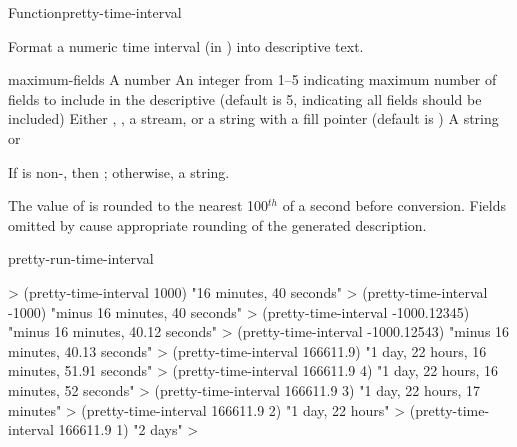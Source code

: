 \documentclass[10pt,twoside,english,pdftex]{article}
\begin{document}

\begin{functiondoc}{Function}{pretty-time-interval}{%
      
    \returns{} }
% 

\fnsyntax

\fnpurpose Format a numeric time interval (in ) into
descriptive text.

\fnpackage {}

\fnmodule {}

\fnargs
\begin{args}{maximum-fields}
\arg[seconds] A number
 An integer from 1--5 indicating maximum number of fields 
to include in the descriptive  (default is 5, indicating all 
fields should be included)
\arg[destination] Either \nil, , a stream, or a string with a fill 
pointer (default is \nil)
\arg[result] A string or \nil{}
\end{args}

\fnreturns If  is non-\nil, then \nil; otherwise, a string.

\fndescription The value of  is rounded to the nearest
100$^{th}$ of a second before conversion.  Fields omitted by
 cause appropriate rounding of the generated
description.

\begin{alsos}{pretty-run-time-interval}
\end{alsos}

\fnexamples
%
\W\supp
\begin{example}
  > (pretty-time-interval 1000)
  "16 minutes, 40 seconds"
  > (pretty-time-interval -1000)
  "minus 16 minutes, 40 seconds"
  > (pretty-time-interval -1000.12345)
  "minus 16 minutes, 40.12 seconds"
  > (pretty-time-interval -1000.12543)
  "minus 16 minutes, 40.13 seconds"\goodpagebreak
  > (pretty-time-interval 166611.9)
  "1 day, 22 hours, 16 minutes, 51.91 seconds"
  > (pretty-time-interval 166611.9 4)
  "1 day, 22 hours, 16 minutes, 52 seconds"
  > (pretty-time-interval 166611.9 3)
  "1 day, 22 hours, 17 minutes"
  > (pretty-time-interval 166611.9 2)
  "1 day, 22 hours"
  > (pretty-time-interval 166611.9 1)
  "2 days"
  >
\end{example}

\end{functiondoc}
\end{document}
